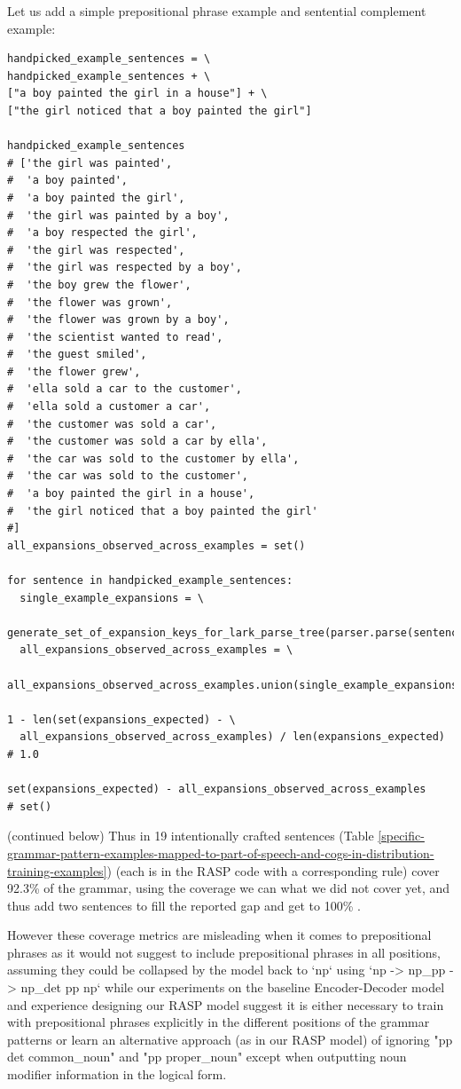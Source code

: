 \documentclass[11pt]{article}
\begin{document}
Let us add a simple prepositional phrase example and sentential complement example:
\begin{tiny}
\begin{verbatim}
handpicked_example_sentences = \
handpicked_example_sentences + \
["a boy painted the girl in a house"] + \
["the girl noticed that a boy painted the girl"]

handpicked_example_sentences
# ['the girl was painted',
#  'a boy painted',
#  'a boy painted the girl',
#  'the girl was painted by a boy',
#  'a boy respected the girl',
#  'the girl was respected',
#  'the girl was respected by a boy',
#  'the boy grew the flower',
#  'the flower was grown',
#  'the flower was grown by a boy',
#  'the scientist wanted to read',
#  'the guest smiled',
#  'the flower grew',
#  'ella sold a car to the customer',
#  'ella sold a customer a car',
#  'the customer was sold a car',
#  'the customer was sold a car by ella',
#  'the car was sold to the customer by ella',
#  'the car was sold to the customer',
#  'a boy painted the girl in a house',
#  'the girl noticed that a boy painted the girl'
#]
all_expansions_observed_across_examples = set()

for sentence in handpicked_example_sentences:
  single_example_expansions = \
    generate_set_of_expansion_keys_for_lark_parse_tree(parser.parse(sentence.lower()))
  all_expansions_observed_across_examples = \
    all_expansions_observed_across_examples.union(single_example_expansions)

1 - len(set(expansions_expected) - \
  all_expansions_observed_across_examples) / len(expansions_expected)
# 1.0

set(expansions_expected) - all_expansions_observed_across_examples
# set()
\end{verbatim}
\end{tiny}
(continued below)
\clearpage
Thus in 19 intentionally crafted sentences (Table \ref{specific-grammar-pattern-examples-mapped-to-part-of-speech-and-cogs-in-distribution-training-examples}) (each is in the RASP code with a corresponding rule) cover 92.3\% of the grammar, 
using the coverage we can what we did not cover yet, and thus add two sentences to fill the reported gap and get to 100\% .

However these coverage metrics are misleading when it comes to prepositional phrases as it would not suggest to include prepositional phrases in all positions, assuming they could be collapsed by the model back to `np` using `np -> np\_pp -> np\_det pp np` while our experiments on the \citep{Wu2023} baseline Encoder-Decoder model and experience designing our RASP model suggest it is either necessary to train with prepositional phrases explicitly in the different positions of the grammar patterns or learn an alternative approach (as in our RASP model) of ignoring "pp det common\_noun" and "pp proper\_noun" except when outputting noun modifier information in the logical form.
\end{document}
